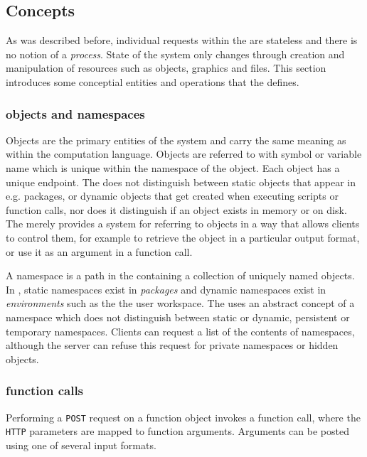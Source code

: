 \subsection{Concepts}

As was described before, individual requests within the \OpenCPU \API are stateless and there is no notion of a \emph{process}. State of the system only changes through creation and manipulation of resources such as objects, graphics and files. This section introduces some conceptial entities and operations that the \OpenCPU \API defines.

\subsubsection{objects and namespaces}

Objects are the primary entities of the system and carry the same meaning as within the computation language. Objects are referred to with symbol or variable name which is unique within the namespace of the object. Each object has a unique \HTTP endpoint. The \API does not distinguish between static objects that appear in e.g. packages, or dynamic objects that get created when executing scripts or function calls, nor does it distinguish if an object exists in memory or on disk. The \API merely provides a system for referring to objects in a way that allows clients to control them, for example to retrieve the object in a particular output format, or use it as an argument in a function call.

A namespace is a path in the \API containing a collection of uniquely named objects. In \R, static namespaces exist in \emph{packages} and dynamic namespaces exist in \emph{environments} such as the the user workspace. The \API uses an abstract concept of a namespace which does not distinguish between static or dynamic, persistent or temporary namespaces. Clients can request a list of the contents of namespaces, although the server can refuse this request for private namespaces or hidden objects. 

\subsubsection{function calls}

Performing a \texttt{POST} request on a function object invokes a function call, where the \texttt{HTTP} parameters are mapped to function arguments. Arguments can be posted using one of several input formats. 

